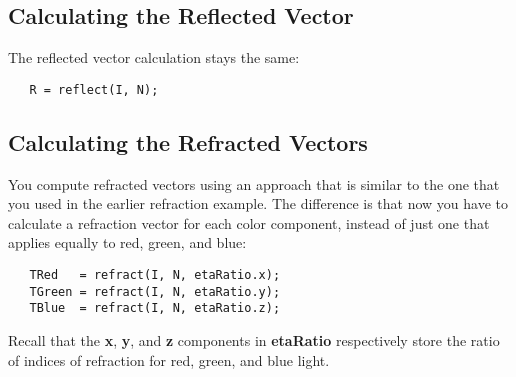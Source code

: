 \documentclass[../main.tex]{subfiles}
\begin{document}
\subsection*{Calculating the Reflected Vector}

The reflected vector calculation stays the same:

\FloatBarrier
\begin{lstlisting}
   R = reflect(I, N);
\end{lstlisting}
\FloatBarrier
   
\subsection*{Calculating the Refracted Vectors}

You compute refracted vectors using an approach that is similar to the one that you used in the earlier refraction example. The difference is that now you have to calculate a refraction vector for each color component, instead of just one that applies equally to red, green, and blue:

\FloatBarrier
\begin{lstlisting}
   TRed   = refract(I, N, etaRatio.x);
   TGreen = refract(I, N, etaRatio.y);
   TBlue  = refract(I, N, etaRatio.z);
\end{lstlisting}
\FloatBarrier
   
Recall that the \textbf{x}, \textbf{y}, and \textbf{z} components in \textbf{etaRatio} respectively store the ratio of indices of refraction for red, green, and blue light.
\end{document}
